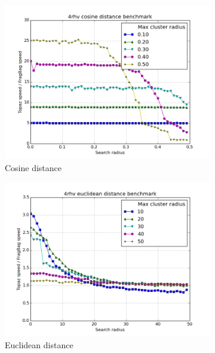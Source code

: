 \documentclass[review,preprint,12pt]{elsarticle}
\theoremstyle{definition}
\theoremstyle{remark}
\numberwithin{equation}{section}
\begin{document}
\begin{figure}[tbp]
    \centering
    \begin{subfigure}[b]{0.40\textwidth}
        \caption{Cosine distance}
        \label{fig:fragbag_cosine}
        \includegraphics[width=1\textwidth]{assets/4rhv_cosine.png}
    \end{subfigure}%
    \begin{subfigure}[b]{0.40\textwidth}
        \caption{Euclidean distance}
        \label{fig:fragbag_euclid}
        \includegraphics[width=1\textwidth]{assets/4rhv_euclid.png}
    \end{subfigure}
    \begin{subfigure}[b]{0.40\textwidth}

\end{subfigure}
\end{figure}
\end{document}
